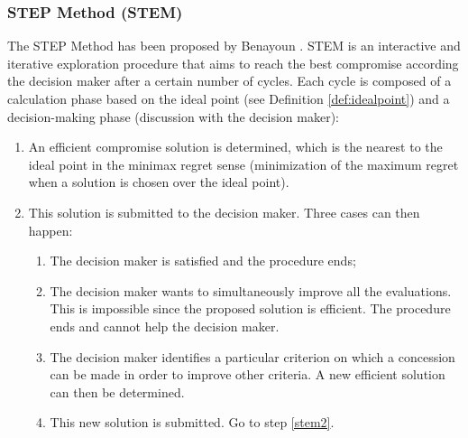
\subsubsection{STEP Method (STEM)}
The STEP Method has been proposed by Benayoun \cite{benayoun71}. STEM is an interactive and iterative exploration procedure that aims to reach the best compromise according the decision maker after a certain number of cycles. Each cycle is composed of a calculation phase based on the ideal point (see Definition \ref{def:idealpoint}) and a decision-making phase (discussion with the decision maker):
\begin{enumerate}
\item An efficient compromise solution is determined, which is the nearest to the ideal point in the minimax regret sense (minimization of the maximum regret when a solution is chosen over the ideal point).
\item \label{stem2} This solution is submitted to the decision maker. Three cases can then happen:
	\begin{enumerate}
	\item The decision maker is satisfied and the procedure ends;
	\item The decision maker wants to simultaneously improve all the evaluations. This is impossible since the proposed solution is efficient. The procedure ends and cannot help the decision maker.
	\item The decision maker identifies a particular criterion on which a concession can be made in order to improve other criteria. A new efficient solution can then be determined.
	\item This new solution is submitted. Go to step \ref{stem2}.
	\end{enumerate}
\end{enumerate}

